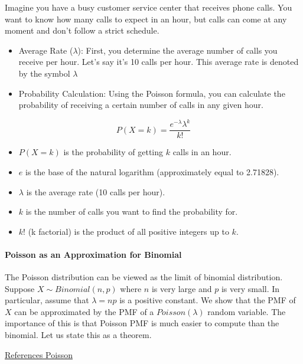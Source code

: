 Imagine you have a busy customer service center that receives phone calls. You want to know how many calls to expect in an hour, but calls can come at any moment and don't follow a strict schedule. 
\begin{itemize}
	\item Average Rate ($\lambda$): First, you determine the average number of calls you receive per hour. Let's say it’s 10 calls per hour. This average rate is denoted by the symbol $\lambda$ 
	\item Probability Calculation: Using the Poisson formula, you can calculate the probability of receiving a certain number of calls in any given hour.
\end{itemize}
\[
P(X = k) = \frac{e^{-λ} λ^k}{k!}
\]
\begin{itemize}
	\item \( P(X = k) \) is the probability of getting \( k \) calls in an hour.
	\item \( e \) is the base of the natural logarithm (approximately equal to 2.71828).
	\item \( \lambda \) is the average rate (10 calls per hour).
	\item \( k \) is the number of calls you want to find the probability for.
	\item \( k! \) (k factorial) is the product of all positive integers up to \( k \).
\end{itemize}


\paragraph{Poisson as an Approximation for Binomial}
 
The Poisson distribution can be viewed as the limit of binomial distribution. Suppose $X\sim Binomial(n,p)$ where $n$ is very large and $p$ is very small. In particular, assume that $\lambda=np$ is a positive constant. We show that the PMF of $X$ can be approximated by the PMF of a $Poisson(\lambda)$ random variable. The importance of this is that Poisson PMF is much easier to compute than the binomial. Let us state this as a theorem.

\href{https://www.probabilitycourse.com/chapter3/3_1_5_special_discrete_distr.php}{References Poisson}


